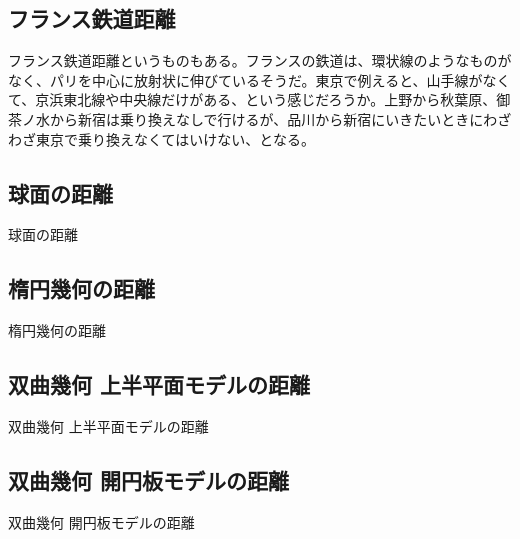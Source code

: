 \newpage


\subsection{フランス鉄道距離}

フランス鉄道距離というものもある。フランスの鉄道は、環状線のようなものがなく、パリを中心に放射状に伸びているそうだ。東京で例えると、山手線がなくて、京浜東北線や中央線だけがある、という感じだろうか。上野から秋葉原、御茶ノ水から新宿は乗り換えなしで行けるが、品川から新宿にいきたいときにわざわざ東京で乗り換えなくてはいけない、となる。

\newpage


\subsection{球面の距離}

球面の距離

\newpage


\subsection{楕円幾何の距離}

楕円幾何の距離

\newpage


\subsection{双曲幾何 上半平面モデルの距離}

双曲幾何 上半平面モデルの距離

\newpage


\subsection{双曲幾何 開円板モデルの距離}

双曲幾何 開円板モデルの距離

\newpage


